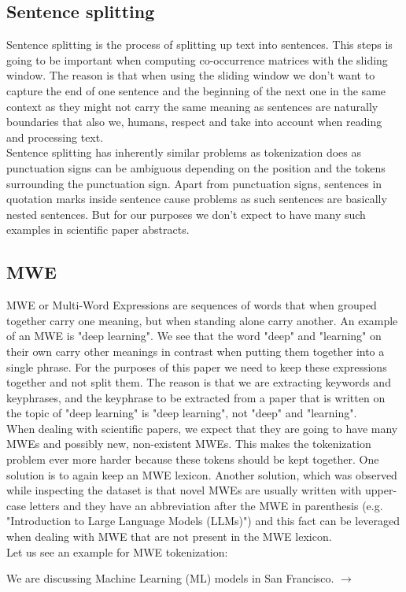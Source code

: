 \documentclass[12pt]{article}
\numberwithin{equation}{section}
\begin{document}
\begin{spacing}{1.5}
	\subsection{Sentence splitting}
	Sentence splitting is the process of splitting up text into sentences. This steps is going to be important when computing co-occurrence matrices with the sliding window. The reason is that when using the sliding window we don't want to capture the end of one sentence and the beginning of the next one in the same context as they might not carry the same meaning as sentences are naturally boundaries that also we, humans, respect and take into account when reading and processing text. \\
	Sentence splitting has inherently similar problems as tokenization does as punctuation signs can be ambiguous depending on the position and the tokens surrounding the punctuation sign. Apart from punctuation signs, sentences in quotation marks inside sentence cause problems as such sentences are basically nested sentences. But for our purposes we don't expect to have many such examples in scientific paper abstracts.
	
	\subsection{MWE}
	MWE or Multi-Word Expressions are sequences of words that when grouped together carry one meaning, but when standing alone carry another. An example of an MWE is "deep learning". We see that the word "deep" and "learning" on their own carry other meanings in contrast when putting them together into a single phrase. For the purposes of this paper we need to keep these expressions together and not split them. The reason is that we are extracting keywords and keyphrases, and the keyphrase to be extracted from a paper that is written on the topic of "deep learning" is "deep learning", not "deep" and "learning". \\
	When dealing with scientific papers, we expect that they are going to have many MWEs and possibly new, non-existent MWEs. This makes the tokenization problem ever more harder because these tokens should be kept together. One solution is to again keep an MWE lexicon. Another solution, which was observed while inspecting the dataset is that novel MWEs are usually written with upper-case letters and they have an abbreviation after the MWE in parenthesis (e.g. "Introduction to Large Language Models (LLMs)") and this fact can be leveraged when dealing with MWE that are not present in the MWE lexicon. \\
	Let us see an example for MWE tokenization:
	\begin{center}
		We are discussing Machine Learning (ML) models in San Francisco. $\rightarrow$ \\
		

\end{center}
\end{spacing}
\end{document}
